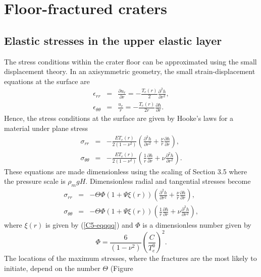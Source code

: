 \chapter{Floor-fractured craters}
\label{chap:A4}

\section{Elastic stresses in the upper elastic layer}
\label{C5-AppendixB}
The  stress conditions  within the  crater floor  can be  approximated
using the small displacement theory.  In an axisymmetric geometry, the
small strain-displacement equations at the surface are
\begin{eqnarray}
  \epsilon_{rr}&=&\frac{\partial u_{r}}{\partial r}=-\frac{T_{e}(r)}{2}\frac{\partial^{2} h}{\partial r^{2}},\\
  \epsilon_{\theta\theta}&=&\frac{u_{r}}{r}=-\frac{T_{e}(r)}{2r}\frac{\partial h}{\partial r} .
\end{eqnarray}
Hence, the stress conditions at the  surface are given by Hooke's laws
for a material under plane stress
\begin{eqnarray}
  \sigma_{rr}&=&-\frac{E T_{e}(r)}{2(1-\nu^2)}\left (\frac{\partial^{2} h}{\partial r^{2}} +\frac{\nu}{r}\frac{\partial h}{\partial r} \right),\\
  \sigma_{\theta\theta}&=&-\frac{E T_{e}(r)}{2(1-\nu^2)}\left (\frac{1}{r}\frac{\partial h}{\partial r}+\nu \frac{\partial^{2}h}{\partial r^2}\right).
\end{eqnarray}
These equations  are made dimensionless  using the scaling  of Section
3.5 where the pressure scale is $\rho_m g H$. Dimensionless radial and
tangential stresses become
\begin{eqnarray}
  \sigma_{rr}&=&- \Theta \Phi \left(1+\Psi \xi(r)\right) \left ( \frac{\partial^{2} h}{\partial r^{2}} +\frac{\nu}{r}\frac{\partial h}{\partial r} \right) ,\\
  \sigma_{\theta\theta}&=&- \Theta \Phi \left(1+\Psi \xi(r)\right) \left (\frac{1}{r}\frac{\partial h}{\partial r}+\nu \frac{\partial^{2}h}{\partial r^2}\right),
\end{eqnarray}
where  $\xi(r)$  is   given  by  (\ref{C5-eqqqq})  and   $\Phi$  is  a
dimensionless number given by
\begin{equation}
  \Phi= \frac{6 }{(1-\nu^2)}\left( \frac{C}{T_{e}^0} \right)^{2}.
\end{equation}
The locations  of the  maximum stresses, where  the fractures  are the
most  likely  to  initiate,  depend on  the  number  $\Theta$  (Figure
